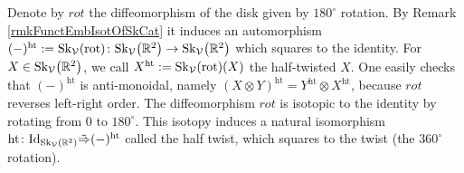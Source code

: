 \documentclass[pdftex]{sigma}%
\numberwithin{equation}{section}
\newcommand{\halft}{{\operatorname{ht}}}
\begin{document}
\begin{Definition}
Denote by $rot$ the diffeomorphism of the disk given by $180^\circ$ rotation. By Remark \ref{rmkFunctEmbIsotOfSkCat} it induces an automorphism $(-)^\halft := {\rm Sk}_\mathcal{V}({\rm rot})\colon {\rm Sk}_\mathcal{V}\big(\mathbb{R}^2\big) \to {\rm Sk}_\mathcal{V}\big(\mathbb{R}^2\big)$ which squares to the identity. For $X \in {\rm Sk}_\mathcal{V}\big(\mathbb{R}^2\big)$, we call $X^\halft := {\rm Sk}_\mathcal{V}({\rm rot})(X)$ the half-twisted $X$. One easily checks that $(-)^\halft$ is anti-monoidal, namely $(X \otimes Y)^\halft = Y^\halft \otimes X^\halft$, because $rot$ reverses left-right order.
The diffeomorphism $rot$ is isotopic to the identity by rotating from 0 to $180^\circ$. This isotopy induces a natural isomorphism $\halft\colon {\rm Id}_{{\rm Sk}_\mathcal{V}(\mathbb{R}^2)} \tilde{\Rightarrow} (-)^\halft$ called the half twist, which squares to the twist (the $360^\circ$ rotation).
\end{Definition}
\end{document}
